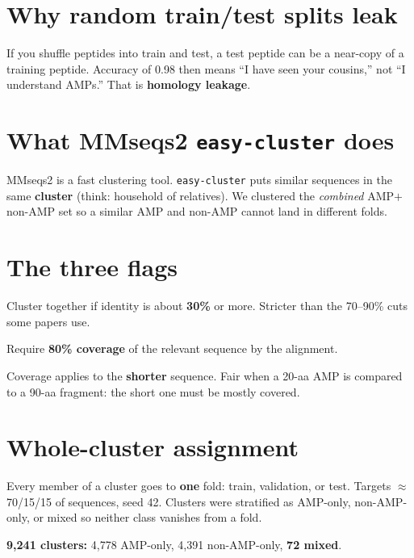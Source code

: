 \documentclass[11pt,a4paper]{report}
\begin{document}
\section{Why random train/test splits leak}

If you shuffle peptides into train and test, a test peptide can be a near-copy of a training peptide. Accuracy of 0.98 then means ``I have seen your cousins,'' not ``I understand AMPs.'' That is \textbf{homology leakage}.

\section{What MMseqs2 \texttt{easy-cluster} does}

MMseqs2 is a fast clustering tool. \texttt{easy-cluster} puts similar sequences in the same \textbf{cluster} (think: household of relatives). We clustered the \emph{combined} AMP$+$non-AMP set so a similar AMP and non-AMP cannot land in different folds.

\section{The three flags}

\begin{description}[style=nextline]
\item[\texttt{-\/-min-seq-id 0.3}] Cluster together if identity is about \textbf{30\%} or more. Stricter than the 70--90\% cuts some papers use.
\item[\texttt{-c 0.8}] Require \textbf{80\% coverage} of the relevant sequence by the alignment.
\item[\texttt{-\/-cov-mode 1}] Coverage applies to the \textbf{shorter} sequence. Fair when a 20-aa AMP is compared to a 90-aa fragment: the short one must be mostly covered.
\end{description}

\section{Whole-cluster assignment}

Every member of a cluster goes to \textbf{one} fold: train, validation, or test. Targets $\approx$ 70/15/15 of sequences, seed 42. Clusters were stratified as AMP-only, non-AMP-only, or mixed so neither class vanishes from a fold.

\textbf{9{,}241 clusters:} 4{,}778 AMP-only, 4{,}391 non-AMP-only, \textbf{72 mixed}.
\end{document}
